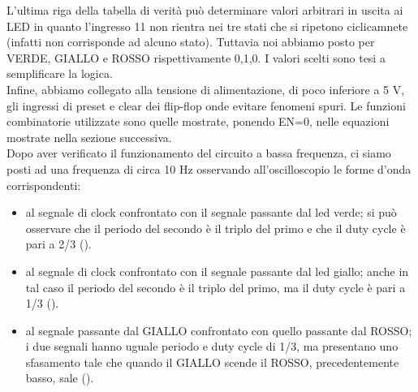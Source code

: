 L'ultima riga della tabella di verità può determinare valori arbitrari in uscita ai LED in quanto l'ingresso 11 non rientra nei tre stati che si ripetono ciclicamnete (infatti non corrisponde ad alcuno stato). Tuttavia noi abbiamo posto per VERDE, GIALLO e ROSSO rispettivamente 0,1,0. I valori scelti sono tesi a semplificare la logica.\\ Infine, abbiamo collegato alla tensione di alimentazione, di poco inferiore a 5 V, gli ingressi di preset e clear dei flip-flop onde evitare fenomeni spuri. Le funzioni combinatorie utilizzate sono quelle mostrate, ponendo EN=0, nelle equazioni mostrate nella sezione successiva.\\
Dopo aver verificato il funzionamento del circuito a bassa frequenza, ci siamo posti ad una frequenza di circa 10 Hz osservando all'oscilloscopio le forme d'onda corrispondenti:
\begin{itemize}
\item al segnale di clock confrontato con il segnale passante dal led verde; si può osservare che il periodo del secondo è il triplo del primo e che il duty cycle è pari a 2/3 ().
\item al segnale di clock confrontato con il segnale passante dal led giallo; anche in tal caso il periodo del secondo è il triplo del primo, ma il duty cycle è pari a 1/3 ().
\item al segnale passante dal GIALLO confrontato con quello passante dal ROSSO; i due segnali hanno uguale periodo e duty cycle di 1/3, ma presentano uno sfasamento tale che quando il GIALLO scende il ROSSO, precedentemente basso, sale ().
\end{itemize}

